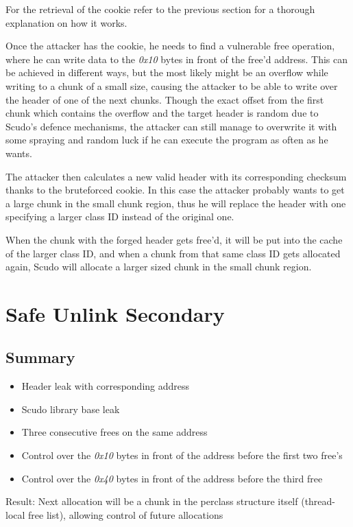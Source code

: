 \documentclass[a4paper,11pt,oneside]{report}
\begin{document}
For the retrieval of the cookie refer to the previous section for a thorough explanation
on how it works.

Once the attacker has the cookie, he needs to find a vulnerable free operation, where he
can write data to the \emph{0x10} bytes in front of the free'd address. This can be
achieved in different ways, but the most likely might be an overflow while writing to a
chunk of a small size, causing the attacker to be able to write over the header of one of
the next chunks. Though the exact offset from the first chunk which contains the overflow
and the target header is random due to Scudo's defence mechanisms, the attacker can still
manage to overwrite it with some spraying and random luck if he can execute the program as
often as he wants.

The attacker then calculates a new valid header with its corresponding checksum thanks to
the bruteforced cookie. In this case the attacker probably wants to get a large chunk in
the small chunk region, thus he will replace the header with one specifying a larger class
ID instead of the original one.


When the chunk with the forged header gets free'd, it will be put into the cache of the
larger class ID, and when a chunk from that same class ID gets allocated again, Scudo will
allocate a larger sized chunk in the small chunk region.

\section{Safe Unlink Secondary}


\subsection{Summary}

\begin{itemize}
\item Header leak with corresponding address
\item Scudo library base leak
\item Three consecutive frees on the same address
\item Control over the \emph{0x10} bytes in front of the address before the first two
  free's
\item Control over the \emph{0x40} bytes in front of the address before the third free
\end{itemize}

Result: Next allocation will be a chunk in the perclass structure itself (thread-local
free list), allowing control of future allocations
\end{document}
